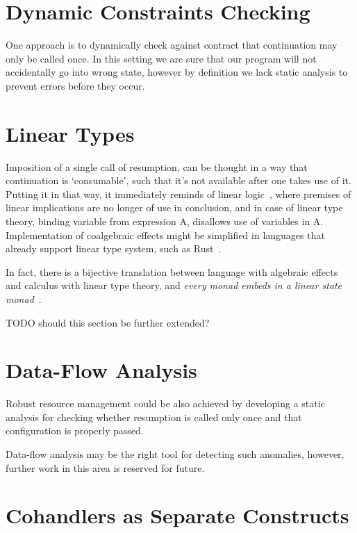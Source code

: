 \documentclass[declaration,shortabstract]{iithesis}
\theoremstyle{definition} \newtheorem{definition}{Definition}[chapter]
\theoremstyle{remark} \newtheorem{remark}[definition]{Observation}
\theoremstyle{plain} \newtheorem{theorem}[definition]{Theorem}
\theoremstyle{plain} \newtheorem{lemma}[definition]{Lemma}
\begin{document}
\section{Dynamic Constraints Checking}

One approach is to dynamically check against contract that continuation may only
be called once. In this setting we are sure that our program will not accidentally
go into wrong state, however by definition we lack static analysis to prevent
errors before they occur.

\section{Linear Types}

Imposition of a single call of resumption, can be thought in a way that continuation
is `consumable', such that it's not available after one takes use of it. Putting
it in that way, it immediately reminds of linear logic~\cite{linear-logic},
where premises of linear implications are no longer of use in conclusion, and
in case of linear type theory, binding variable from expression A, disallows
use of variables in A. Implementation of coalgebraic effects might be simplified
in languages that already support linear type system, such as Rust~\cite{rust}.

In fact, there is a bijective translation between language with algebraic effects
and calculus with linear type theory, and \textit{every monad embeds in a linear
state monad}~\cite{linear-usage-of-state}.

\noindent
TODO should this section be further extended?

\section{Data-Flow Analysis}\label{sec:data-flow}

Robust resource management could be also achieved by developing a static
analysis for checking whether resumption is called only once and that
configuration is properly passed.

Data-flow analysis may be the right tool for detecting such anomalies, however,
further work in this area is reserved for future.

\section{Cohandlers as Separate Constructs}\label{sec:cohandlers-solution}
\end{document}
